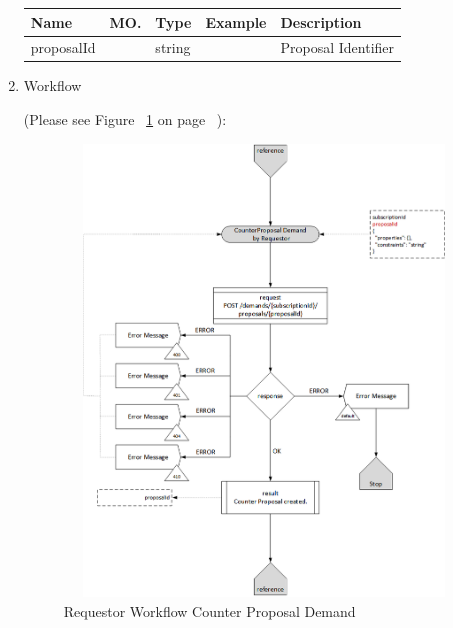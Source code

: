 \begin{enumerate}
\begin{center}
\begin{tabular}{|p{3cm}|l|p{3cm}|p{3cm}|p{4cm}|} 
\hline
\rowcolor{lightgray}	Name	& MO.	& Type	& Example & 	Description \\
\hline

proposalId	&	&	string				&								& Proposal Identifier \\
\hline

\end{tabular}
\end{center}


\item Workflow

(Please see Figure ~\ref{fig:CPD} on page ~\pageref{fig:CPD}):

\begin{figure}[H]
    \centering
    \includegraphics[width=12cm,height=12cm,angle=0]{./diag/Workflow/Market/CounterProposalDemand-R-Workflow.png}
    \caption{Requestor Workflow Counter Proposal Demand }
	\label{fig:CPD}
\end{figure}


\end{enumerate}

\newpage


